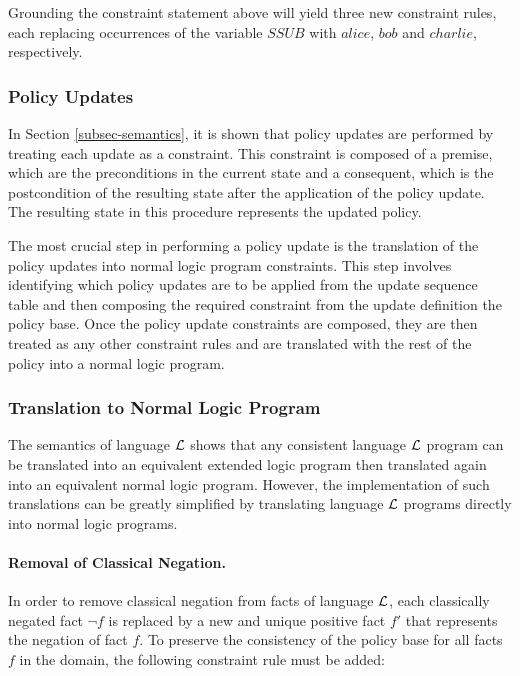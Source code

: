 \documentclass[global,twocolumn,draft]{svjour}
\begin{document}
        Grounding the constraint statement above will yield three new
        constraint rules, each replacing occurrences of the variable $SSUB$
        with $alice$, $bob$ and $charlie$, respectively.

      \subsubsection{Policy Updates}

        In Section \ref{subsec-semantics}, it is shown that policy updates are
        performed by treating each update as a constraint. This constraint is
        composed of a premise, which are the preconditions in the current state
        and a consequent, which is the postcondition of the resulting state
        after the application of the policy update. The resulting state in this
        procedure represents the updated policy.

        The most crucial step in performing a policy update is the translation
        of the policy updates into normal logic program constraints. This step
        involves identifying which policy updates are to be applied from the
        update sequence table and then composing the required constraint from
        the update definition the policy base. Once the policy update
        constraints are composed, they are then treated as any other
        constraint rules and are translated with the rest of the policy into
        a normal logic program.

      \subsubsection{Translation to Normal Logic Program}

        The semantics of language ${\cal L}$ shows that any consistent language
        ${\cal L}$ program can be translated into an equivalent extended logic
        program then translated again into an equivalent normal logic program.
        However, the implementation of such translations can be greatly
        simplified by translating language ${\cal L}$ programs directly into
        normal logic programs.

        \paragraph{Removal of Classical Negation.}

          In order to remove classical negation from facts of language
          ${\cal L}$, each classically negated fact $\lnot$$f$ is replaced by
          a new and unique positive fact $f'$ that represents the negation of
          fact $f$. To preserve the consistency of the policy base for all
          facts $f$ in the domain, the following constraint rule must be added:
\end{document}

